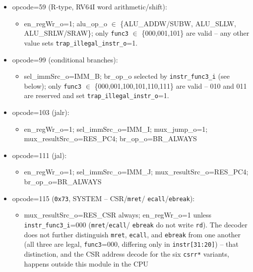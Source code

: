 \begin{itemize}
\begin{itemize}
\begin{itemize}
\begin{itemize}
          mux\_aluSrcB\_o=1; alu\_op\_o=ALU\_ADD (result = 0 + imm)
      \end{itemize}
      \item opcode=59 (R-type, RV64I word arithmetic/shift):
      \begin{itemize}
        \item en\_regWr\_o=1; alu\_op\_o $\in$ \{ALU\_ADDW/SUBW, ALU\_SLLW,
          ALU\_SRLW/SRAW\}; only \texttt{func3} $\in$ \{000,001,101\} are
          valid -- any other value sets \texttt{trap\_illegal\_instr\_o}=1.
      \end{itemize}
      \item opcode=99 (conditional branches):
      \begin{itemize}
        \item sel\_immSrc\_o=IMM\_B; br\_op\_o selected by
          \texttt{instr\_func3\_i} (see below); only \texttt{func3}
          $\in$ \{000,001,100,101,110,111\} are valid -- 010 and 011 are
          reserved and set \texttt{trap\_illegal\_instr\_o}=1.
      \end{itemize}
      \item opcode=103 (jalr):
      \begin{itemize}
        \item en\_regWr\_o=1; sel\_immSrc\_o=IMM\_I; mux\_jump\_o=1;
          mux\_resultSrc\_o=RES\_PC4; br\_op\_o=BR\_ALWAYS
      \end{itemize}
      \item opcode=111 (jal):
      \begin{itemize}
        \item en\_regWr\_o=1; sel\_immSrc\_o=IMM\_J; mux\_resultSrc\_o=RES\_PC4;
          br\_op\_o=BR\_ALWAYS
      \end{itemize}
      \item opcode=115 (\texttt{0x73}, SYSTEM -- CSR/\texttt{mret}/
        \texttt{ecall}/\texttt{ebreak}):
      \begin{itemize}
        \item mux\_resultSrc\_o=RES\_CSR always; en\_regWr\_o=1 unless
          \texttt{instr\_func3\_i}=000 (\texttt{mret}/\texttt{ecall}/
          \texttt{ebreak} do not write \texttt{rd}). The decoder does not
          further distinguish \texttt{mret}, \texttt{ecall}, and
          \texttt{ebreak} from one another (all three are legal,
          \texttt{func3}=000, differing only in \texttt{instr[31:20]}) --
          that distinction, and the CSR address decode for the six
          \texttt{csrr*} variants, happens outside this module in the CPU

\end{itemize}
\end{itemize}
\end{itemize}
\end{itemize}

